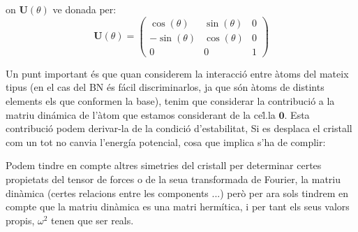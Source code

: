 \documentclass[12pt]{article} %
\let\vec\mathbf %
\begin{document}
on $\vec U(\theta)$ ve donada per:
\begin{equation}
\vec U(\theta)=
\begin{pmatrix}
\cos(\theta)  & \sin(\theta) & 0 \\
-\sin(\theta) & \cos(\theta) & 0  \\
0             & 0            & 1
\end{pmatrix}
\end{equation}

Un punt important és que quan considerem la interacció entre àtoms del mateix tipus (en el cas del BN és fácil discriminarlos, ja que són àtoms de distints elements els que conformen la base), tenim que considerar la contribució a la matriu dinámica de l'àtom que estamos considerant de la ce\.l.la $\vec 0$. Esta contribució podem derivar-la de la condició d'estabilitat, %
Si es desplaca el cristall com un tot no canvia l'energía potencial, cosa que implica s'ha de complir:


Podem tindre en compte altres simetries del cristall per determinar certes propietats del tensor de forces o de la seua transformada de Fourier, la matriu dinàmica (certes relacions entre les components ...) però per ara sols tindrem en compte que la matriu dinàmica es una matri hermítica, i per tant els seus valors propis, $\omega^2$ tenen que ser reals.

\vspace{5cm}
\end{document}

